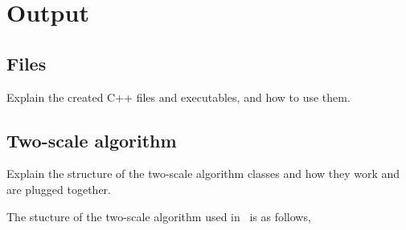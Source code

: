 \section{Output}
\subsection{Files}

Explain the created C++ files and executables, and how to use them.

\subsection{Two-scale algorithm}

Explain the structure of the two-scale algorithm classes and how they
work and are plugged together.


The stucture of the two-scale algorithm used in \flexisusy\ is as follows,%

